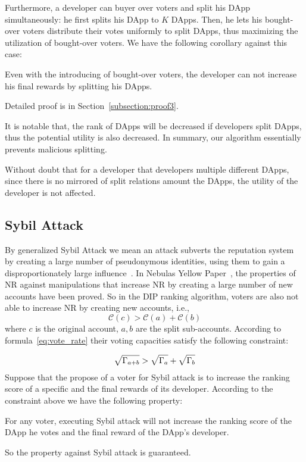 Furthermore, a developer can buyer over voters and split his DApp simultaneously: he first splits his DApp to $K$ DApps. Then, he lets his bought-over voters distribute their votes uniformly to split DApps, thus  maximizing the utilization of  bought-over  voters. We have the following corollary against this case:
\begin{corollary}
	\label{c1}
	Even with the introducing of bought-over voters, the developer can not increase his final rewards by splitting his DApps.
\end{corollary}

Detailed proof is in Section~\ref{subsection:proof3}.

It is notable that, the rank of DApps will be decreased if developers split DApps, thus the potential utility is also decreased. In summary, our algorithm essentially prevents malicious splitting.

Without doubt that for a developer that developers multiple different  DApps, since there is no mirrored of split relations amount the DApps, the utility of the developer is not affected.

\subsection{Sybil Attack}
By generalized Sybil Attack we mean an attack subverts the reputation system by creating a large number of pseudonymous identities, using them to gain a disproportionately large influence~\cite{quercia2010sybil}. In Nebulas Yellow Paper~\cite{Nebulasyellowpaper}, the properties of NR against manipulations that increase NR by creating a large number of new accounts have been proved. So in the DIP ranking algorithm, voters are also not able to increase NR by creating new accounts, i.e.,
$$\mathcal{C}(c)>\mathcal{C}(a)+\mathcal{C}(b)$$
where $c$ is the original account, $a,b$ are the split sub-accounts. According to formula~\ref{eq:vote_rate} their voting capacities satisfy the following constraint:

\begin{align}
	\label{eq:sqrt_nr}
	\sqrt{\Gamma_{a+b}}>\sqrt{\Gamma_a}+\sqrt{\Gamma_b}
\end{align}
Suppose that the propose of a voter for Sybil attack is to increase the ranking score of a specific and the final rewards of its developer. According to the constraint above we have the following property:

\begin{property}
	\label{p3}
    For any voter, executing Sybil attack will not increase the ranking score of the DApp he votes and the final reward of the DApp's developer.
\end{property}
So the property against Sybil attack is guaranteed.


